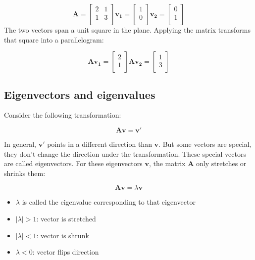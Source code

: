 \documentclass[
]{article}
\providecommand{\tightlist}{%
  \setlength{\itemsep}{0pt}\setlength{\parskip}{0pt}}
\begin{document}
\[
\mathbf{A} =
\begin{bmatrix}
2 & 1 \\
1 & 3 \\
\end{bmatrix}
\mathbf{v_1} =
\begin{bmatrix}
1 \\
0 \\
\end{bmatrix}
\mathbf{v_2} =
\begin{bmatrix}
0 \\
1 \\
\end{bmatrix}
\] The two vectors span a unit square in the plane. Applying the matrix
transforms that square into a parallelogram:

\[
\mathbf{Av_1} = 
\begin{bmatrix}
2 \\
1 \\
\end{bmatrix}
\mathbf{Av_2} = 
\begin{bmatrix}
1 \\
3 \\
\end{bmatrix}
\]

\hypertarget{eigenvectors-and-eigenvalues}{%
\subsection{Eigenvectors and
eigenvalues}\label{eigenvectors-and-eigenvalues}}

Consider the following transformation:

\[
\mathbf{Av} = \mathbf{v'}
\]

In general, \(\mathbf{v'}\) points in a different direction than
\(\mathbf{v}\). But some vectors are special, they don't change the
direction under the transformation. These special vectors are called
eigenvectors. For these eigenvectors \(\mathbf{v}\), the matrix
\(\mathbf{A}\) only stretches or shrinks them:

\[
\mathbf{Av} = \lambda \mathbf{v}
\]

\begin{itemize}
\tightlist
\item
  \(\lambda\) is called the eigenvalue corresponding to that eigenvector
\item
  \(|\lambda|>1\): vector is stretched
\item
  \(|\lambda|<1\): vector is shrunk
\item
  \(\lambda<0\): vector flips direction
\end{itemize}
\end{document}
